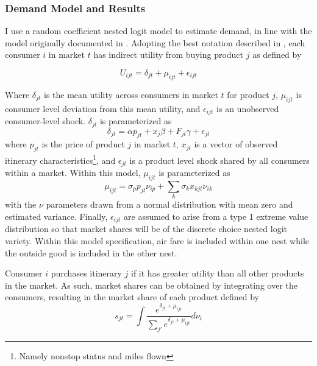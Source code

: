 \documentclass{article}
\begin{document}
	\subsubsection{Demand Model and Results}
	\label{sec:Analysis_Demand}
	I use a random coefficient nested logit model to estimate demand, in line with the model originally documented in \citet{berry_automobile_1995}. Adopting the best notation described in \citet{conlon_best_2020}, each consumer $i$ in market $t$ has indirect utility from buying product $j$ as defined by 
	
	\[U_{ijt} = \delta_{jt} + \mu_{ijt} + \epsilon_{ijt}\]
	
	Where $\delta_{jt}$ is the mean utility across consumers in market $t$ for product $j$, $\mu_{ijt}$ is consumer level deviation from this mean utility, and $\epsilon_{ijt}$ is an unobserved consumer-level shock. $\delta_{jt}$ is parameterized as \[\delta_{jt} = \alpha p_{jt} + x_{j} \beta + F_{jt}\gamma  +  \epsilon_{jt}\] where $p_{jt}$ is the price of product $j$ in market $t$, $x_{jt}$ is a vector of observed itinerary characteristics\footnote{Namely nonstop status and miles flown}, and $\epsilon_{jt}$ is a product level shock shared by all consumers within a market. Within this model, $\mu_{ijt}$ is parameterized as \[\mu_{ijt} = \sigma_{p} p_{jt} \nu_{ip} + \sum_{k} \sigma_{k} x_{kjt} \nu_{ik} \] with the $\nu$ parameters drawn from a  normal distribution with mean zero and estimated variance. Finally, $\epsilon_{ijt}$ are assumed to arise from a type 1 extreme value distribution so that market shares will be of the discrete choice nested logit variety. Within this model specification, air fare is included within one nest while the outside good is included in the other nest.
	
	Consumer $i$ purchases itinerary $j$ if it has greater utility than all other products in the market. As such, market shares can be obtained by integrating over the consumers, resulting in the market share of each product defined by \[s_{jt} = \int \frac{e^{\delta_{jt} + \mu_{ijt}}}{\sum_{j'} e^{\delta_{jt} + \mu_{ijt}}} d{\nu_{i}}\]
	
\end{document}

